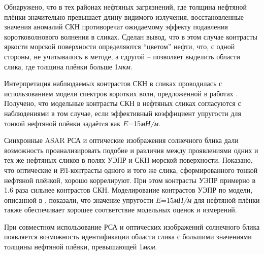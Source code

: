 Обнаружено, что в тех районах нефтяных загрязнений, где толщина нефтяной плёнки значительно превышает длину видимого излучения, восстановленные значения аномалий СКН противоречат ожидаемому эффекту подавления коротковолнового волнения в сликах. Сделан вывод, что в этом случае контрасты яркости морской поверхности определяются ``цветом'' нефти, что, с одной стороны, не учитывалось в методе,  а сдругой -- позволяет выделить области слика, где толщина плёнки больше 1\textit{мкм}.

Интерпретация наблюдаемых контрастов СКН в сликах проводилась с использованием модели спектров коротких волн, предложенной в работах \citep{Kudryavtsev2005, 2008, Yurovskaya2013}. Получено, что модельные контрасты СКН в нефтяных сликах согласуются с наблюдениями в том случае, если эффективный коэффициент упругости для тонкой нефтяной плёнки задаётcя как $E$=15\textit{мН/м}.

Синхронные ASAR РСА и оптические изображения солнечного блика дали возможность проанализировать подобие и различия между проявлениями одних и тех же нефтяных сликов в полях УЭПР и СКН морской поверхности. Показано, что оптические и РЛ-контрасты одного и того же слика, сформированного тонкой нефтяной плёнкой, хорошо коррелируют. При этом контрасты УЭПР примерно в 1.6 раза сильнее контрастов СКН. Моделирование контрастов УЭПР по модели, описанной в \citep{2008}, показали, что значение упругости $E$=15\textit{мН/м} для нефтяной плёнки также обеспечивает хорошее соответствие модельных оценок и измерений.

При совместном использование РСА и оптических изображений солнечного блика появляется возможность идентификации области слика с большими значениями толщины нефтяной плёнки, превышающей 1\textit{мкм}.



\clearpage